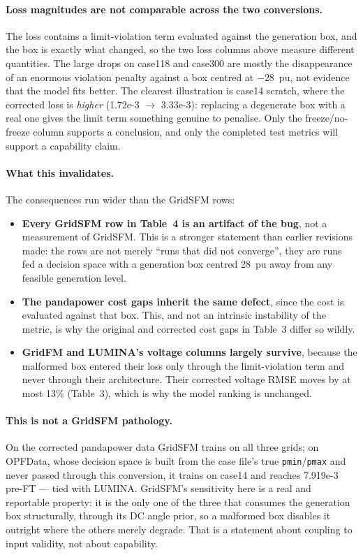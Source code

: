 \documentclass[10pt]{article}
\begin{document}
\paragraph{Loss magnitudes are not comparable across the two conversions.} The
loss contains a limit-violation term evaluated against the generation box, and
the box is exactly what changed, so the two loss columns above measure different
quantities. The large drops on case118 and case300 are mostly the disappearance
of an enormous violation penalty against a box centred at \(-28\)~pu, not
evidence that the model fits better. The clearest illustration is case14
scratch, where the corrected loss is \emph{higher} (1.72e-3 \(\rightarrow\)
3.33e-3): replacing a degenerate box with a real one gives the limit term
something genuine to penalise. Only the freeze/no-freeze column supports a
conclusion, and only the completed test metrics will support a capability claim.

\paragraph{What this invalidates.} The consequences run wider than the GridSFM
rows:

\begin{itemize}\itemsep2pt
\item \textbf{Every GridSFM row in Table~4 is an artifact of the bug}, not a
measurement of GridSFM. This is a stronger statement than earlier revisions
made: the rows are not merely ``runs that did not converge'', they are runs fed
a decision space with a generation box centred 28~pu away from any feasible
generation level.
\item \textbf{The pandapower cost gaps inherit the same defect}, since the cost
is evaluated against that box. This, and not an intrinsic instability of the
metric, is why the original and corrected cost gaps in Table~3 differ so wildly.
\item \textbf{GridFM and LUMINA's voltage columns largely survive}, because the
malformed box entered their loss only through the limit-violation term and never
through their architecture. Their corrected voltage RMSE moves by at most 13\%
(Table~3), which is why the model ranking is unchanged.
\end{itemize}

\paragraph{This is not a GridSFM pathology.} On the corrected pandapower data
GridSFM trains on all three grids; on OPFData, whose decision space is built from
the case file's true \texttt{pmin}/\texttt{pmax} and never passed through this
conversion, it trains on case14 and reaches 7.919e-3 pre-FT --- tied with LUMINA.
GridSFM's sensitivity here is a real and reportable property: it is the only one
of the three that consumes the generation box structurally, through its DC angle
prior, so a malformed box disables it outright where the others merely degrade.
That is a statement about coupling to input validity, not about capability.
\end{document}
